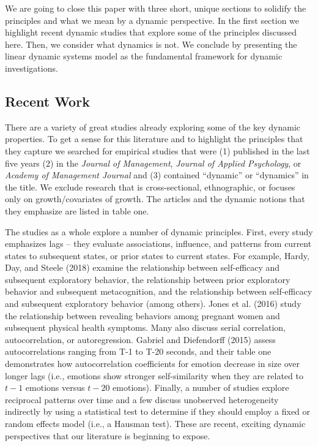 \documentclass[english,,man]{apa6}
\theoremstyle{definition}
\theoremstyle{definition}
\theoremstyle{definition}
\theoremstyle{remark}
\begin{document}
We are going to close this paper with three short, unique sections to
solidify the principles and what we mean by a dynamic perspective. In
the first section we highlight recent dynamic studies that explore some
of the principles discussed here. Then, we consider what dynamics is
not. We conclude by presenting the linear dynamic systems model as the
fundamental framework for dynamic investigations.

\hypertarget{recent-work}{%
\subsection{Recent Work}\label{recent-work}}

There are a variety of great studies already exploring some of the key
dynamic properties. To get a sense for this literature and to highlight
the principles that they capture we searched for empirical studies that
were (1) published in the last five years (2) in the \emph{Journal of
Management}, \emph{Journal of Applied Psychology}, or \emph{Academy of
Management Journal} and (3) contained \enquote{dynamic} or
\enquote{dynamics} in the title. We exclude research that is
cross-sectional, ethnographic, or focuses only on growth/covariates of
growth. The articles and the dynamic notions that they emphasize are
listed in table one.

The studies as a whole explore a number of dynamic principles. First,
every study emphasizes lags -- they evaluate associations, influence,
and patterns from current states to subsequent states, or prior states
to current states. For example, Hardy, Day, and Steele (2018) examine
the relationship between self-efficacy and subsequent exploratory
behavior, the relationship between prior exploratory behavior and
subsequent metacognition, and the relationship between self-efficacy and
subsequent exploratory behavior (among others). Jones et al. (2016)
study the relationship between revealing behaviors among pregnant women
and subsequent physical health symptoms. Many also discuss serial
correlation, autocorrelation, or autoregression. Gabriel and Diefendorff
(2015) assess autocorrelations ranging from T-1 to T-20 seconds, and
their table one demonstrates how autocorrelation coefficients for
emotion decrease in size over longer lags (i.e., emotions show stronger
self-similarity when they are related to \(t-1\) emotions versus
\(t-20\) emotions). Finally, a number of studies explore reciprocal
patterns over time and a few discuss unobserved heterogeneity indirectly
by using a statistical test to determine if they should employ a fixed
or random effects model (i.e., a Hausman test). These are recent,
exciting dynamic perspectives that our literature is beginning to
expose.
\end{document}
